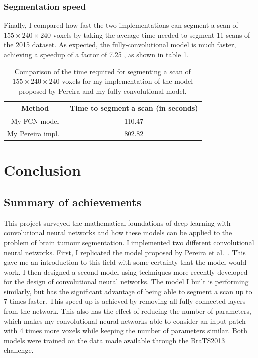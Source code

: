 \documentclass[12pt,a4paper,twoside,openright]{report}
\begin{document}
\subsection{Segmentation speed}
Finally, I compared how fast the two implementations can segment a scan of $155 \times 240 \times 240$ voxels by taking the average time needed to segment 11 scans of the 2015 dataset. As expected, the fully-convolutional model is much faster, achieving a speedup of a factor of 7.25 , as shown in table \ref{table:time_comparison}.
\begin{table}[h]
\centering	
\begin{tabular}{c | c }
Method & Time to segment a scan (in seconds)\\
 \hline
 My FCN model & 110.47 \\
 My Pereira impl.\ & 802.82 \\
\end{tabular}
\caption{Comparison of the time required for segmenting a scan of $155 \times 240 \times 240$ voxels for my implementation of the model proposed by Pereira and my fully-convolutional model.}
\label{table:time_comparison}
\end{table}

\chapter{Conclusion}
\section{Summary of achievements}
This project surveyed the mathematical foundations of deep learning with convolutional neural networks and how these models can be applied to the problem of brain tumour segmentation. I implemented two different convolutional neural networks. First, I replicated the model proposed by Pereira et al.\ \cite{pereira}. This gave me an introduction to this field with some certainty that the model would work. I then designed a second model using techniques more recently developed for the design of convolutional neural networks. The model I built is performing similarly, but has the significant advantage of being able to segment a scan up to 7 times faster. This speed-up is achieved by removing all fully-connected layers from the network. This also has the effect of reducing the number of parameters, which makes my convolutional neural networks able to consider an input patch with 4 times more voxels while keeping the number of parameters similar. Both models were trained on the data made available through the BraTS2013 challenge.
\end{document}
